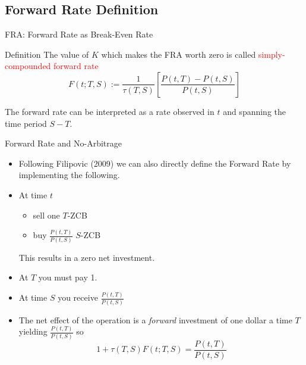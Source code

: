 \documentclass{beamer}
\begin{document}
\subsection{Forward Rate Definition}
\begin{frame}{FRA: Forward Rate as Break-Even Rate}
	\begin{block}{Definition}
		The value of $K$ which makes the FRA worth zero is called \textcolor{red}{simply-compounded forward rate}
		\begin{equation}
			F(t;T,S):=\frac{1}{\tau(T,S)}\left[\frac{P(t,T)-P(t,S)}{P(t,S)}\right]
			\label{eq:forward_rate_definition}
		\end{equation}
	\end{block}
	
	The forward rate can be interpreted as a rate observed in $t$ and spanning the time period $S-T$.
	
	
\end{frame}

\begin{frame}{Forward Rate and No-Arbitrage}
	\begin{itemize}
		\item Following Filipovic (2009) we can also directly define the Forward Rate by implementing the following.
		\item At time $t$
		\begin{itemize}
			\item sell one $T$-ZCB
			\item buy $\frac{P(t,T)}{P(t,S)}$ $S$-ZCB 
		\end{itemize}
		This results in a zero net investment.
		\item At $T$ you must pay 1.
		\item At time $S$ you receive $\frac{P(t,T)}{P(t,S)}$
		\item The net effect of the operation is a \emph{forward} investment of one dollar a time $T$ yielding $\frac{P(t,T)}{P(t,S)}$ so
		\begin{equation*}
		1 + \tau(T,S)F(t;T,S) = \frac{P(t,T)}{P(t,S)}
		\end{equation*}
	\end{itemize}
\end{frame}
\end{document}
